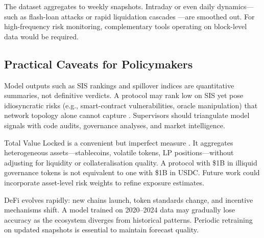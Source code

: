 \documentclass[preprint,12pt]{elsarticle}
\renewcommand{\paragraph}[1]{}
\begin{document}
\paragraph{Temporal resolution.}
The dataset aggregates to weekly snapshots. Intraday or even daily dynamics---such as flash-loan attacks \citep{Qin2021FlashLoans} or rapid liquidation cascades \citep{Warmuz2023ToxicLiquidationSpirals}---are smoothed out. For high-frequency risk monitoring, complementary tools operating on block-level data would be required.


\subsection{Practical Caveats for Policymakers}
\label{subsec:caveats}

\paragraph{Complement, not replace, qualitative judgment.}
Model outputs such as SIS rankings and spillover indices are quantitative summaries, not definitive verdicts. A protocol may rank low on SIS yet pose idiosyncratic risks (e.g., smart-contract vulnerabilities, oracle manipulation) that network topology alone cannot capture \citep{DuleyEtAl2023Oracle,Gogol2024SoKDeFi}. Supervisors should triangulate model signals with code audits, governance analyses, and market intelligence.

\paragraph{TVL as a proxy for exposure.}
Total Value Locked is a convenient but imperfect measure \citep{Bertomeu2024}. It aggregates heterogeneous assets---stablecoins, volatile tokens, LP positions---without adjusting for liquidity or collateralisation quality. A protocol with \$1B in illiquid governance tokens is not equivalent to one with \$1B in USDC. Future work could incorporate asset-level risk weights to refine exposure estimates.

\paragraph{Model drift and retraining.}
DeFi evolves rapidly: new chains launch, token standards change, and incentive mechanisms shift. A model trained on 2020--2024 data may gradually lose accuracy as the ecosystem diverges from historical patterns. Periodic retraining on updated snapshots is essential to maintain forecast quality.
\end{document}
